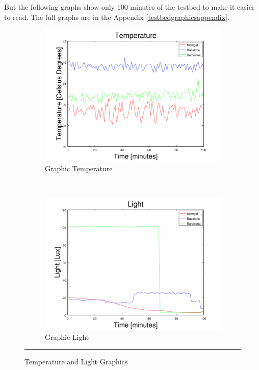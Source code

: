 \documentclass[12pt, a4paper,twoside]{tesi_upf}
\begin{document}
      But the following graphs show only 100 minutes of the testbed to make it easier to read. The full graphs are in the Appendix \ref{testbedgraphicsappendix}.

      \begin{figure}[H]
        \centering
        \begin{subfigure}[b]{0.49\textwidth}
                \includegraphics[width=\textwidth]{./Figures/GraphicTemperature.png}
                \caption{Graphic Temperature}
                \label{fig:GraphicTemperature}
        \end{subfigure}%
        ~ %
        \begin{subfigure}[b]{0.49\textwidth}
                \includegraphics[width=\textwidth]{./Figures/GraphicLight.png}
                \caption{Graphic Light}
                \label{fig:GraphicLight}
        \end{subfigure}
        \rule{30em}{0.5pt}
        \caption{Temperature and Light Graphics}\label{fig:TestbedResults1}
			\end{figure}
\end{document}
